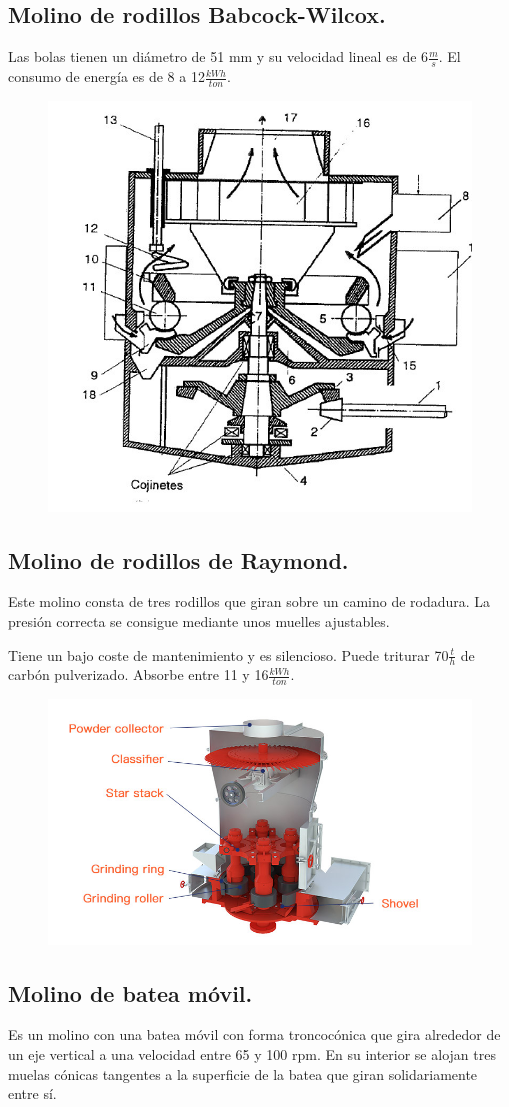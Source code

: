\subsection{Molino de rodillos Babcock-Wilcox.}
Las bolas tienen un diámetro de 51 mm y su velocidad lineal es de 6$\frac{m}{s}$. El consumo de energía es de 8 a 12$\frac{kWh}{ton}$.
\begin{figure}[H]
	\centering
	\includegraphics[width=0.3\linewidth]{res/tema10/babcock}
	\label{fig:babcock}
\end{figure}

\subsection{Molino de rodillos de Raymond.}
Este molino consta de tres rodillos que giran sobre un camino de rodadura. La presión correcta se consigue mediante unos muelles ajustables.


Tiene un bajo coste de mantenimiento y es silencioso. Puede triturar 70$\frac{t}{h}$ de carbón pulverizado. Absorbe entre 11 y 16$\frac{kWh}{ton}$.
\begin{figure}[H]
	\centering
	\includegraphics[width=0.5 \linewidth]{res/tema10/raymond}
	\label{fig:raymond}
\end{figure}

\subsection{Molino de batea móvil.}
Es un molino  con una batea móvil con forma troncocónica que gira alrededor de un eje vertical a una velocidad entre 65 y 100 rpm. En su interior se alojan tres muelas cónicas tangentes a la superficie de la batea que giran solidariamente entre sí.





